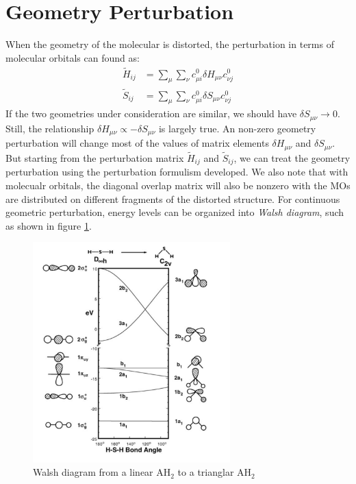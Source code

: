 \documentclass{article}
\begin{document}
\section{Geometry Perturbation}
When the geometry of the molecular is distorted, the perturbation in terms of molecular orbitals can found as:
\begin{align}
    \tilde{H}_{ij} &= \sum_{\mu}\sum_{\nu} c_{\mu i}^0 \delta H_{\mu \nu} c_{\nu j}^0 \\ 
    \tilde{S}_{ij} &= \sum_{\mu}\sum_{\nu} c_{\mu i}^0 \delta S_{\mu \nu} c_{\nu j}^0 
\end{align} 
If the two geometries under consideration are similar, we should have $\delta S_{\mu \nu} \to 0$. Still, the relationship
$\delta H_{\mu \nu} \propto - \delta S_{\mu \nu}$ is largely true. An non-zero geometry perturbation will change most 
of the values of matrix elements $\delta H_{\mu \nu}$ and $\delta S_{\mu \nu}$. But starting from the perturbation 
matrix $\tilde{H}_{ij}$ and $\tilde{S}_{ij}$, we can treat the geometry perturbation using the perturbation formulism 
developed. We also note that with molecualr orbitals, the diagonal overlap matrix will also be nonzero with the 
MOs are distributed on different fragments of the distorted structure. For continuous geometric perturbation, energy 
levels can be organized into \emph{Walsh diagram}, such as shown in figure \ref{F:walsh_diagram}.
\begin{figure}[h!]
    \centering
    \includegraphics[width=3in]{F_walsh_diagram.png}
    \caption{Walsh diagram from a linear AH$_2$ to a trianglar AH$_2$}
    \label{F:walsh_diagram}
\end{figure}
\end{document}
